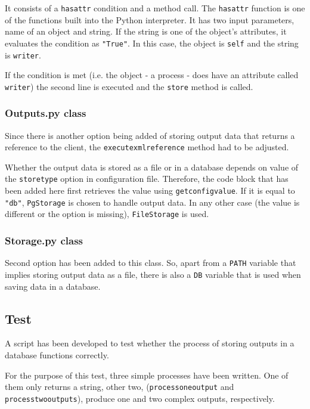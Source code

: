 It consists of a \texttt{hasattr} condition and a method call. The \texttt{hasattr} function is one of the functions built into the Python interpreter. It has two input parameters, name of an object and string. If the string is one of the object's attributes, it evaluates the condition as \texttt{"True"}. \cite{hasattr} In this case, the object is \texttt{self} and the string is \texttt{writer}. 

If the condition is met (i.e. the object - a process - does have an attribute called \texttt{writer}) the second line is executed and the \texttt{store} method is called.

\subsubsection{Outputs.py class}

Since there is another option being added of storing output data that returns a reference to the client, the \texttt{\textunderscore execute\textunderscore xml\textunderscore reference} method had to be adjusted.

Whether the output data is stored as a file or in a database depends on value of the \texttt{store\textunderscore type} option in configuration file. Therefore, the code block that has been added here first retrieves the value using \texttt{get\textunderscore config\textunderscore value}. If it is equal to \texttt{"db"}, \texttt{PgStorage} is chosen to handle output data. In any other case (the value is different or the option is missing), \texttt{FileStorage} is used.

\subsubsection{Storage.py class}

Second option has been added to this class. So, apart from a \texttt{PATH} variable that implies storing output data as a file, there is also a \texttt{DB} variable that is used when saving data in a database.

\subsection{Test} 

A script has been developed to test whether the process of storing outputs in a database functions correctly.

For the purpose of this test, three simple processes have been written. One of them only returns a string, other two, (\texttt{process\textunderscore one\textunderscore output} and \texttt{process\textunderscore two\textunderscore outputs}), produce one and two complex outputs, respectively. 

